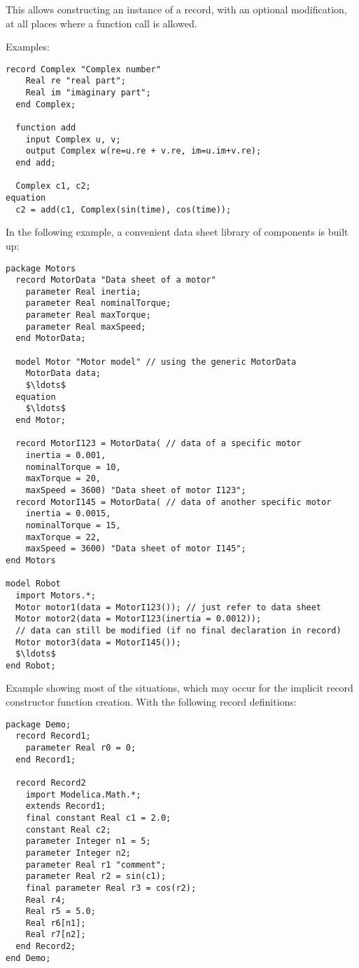 \begin{nonnormative}
This allows constructing an instance of a record, with an
optional modification, at all places where a function call is allowed.

Examples:
\begin{lstlisting}[language=modelica]
  record Complex "Complex number"
    Real re "real part";
    Real im "imaginary part";
  end Complex;

  function add
    input Complex u, v;
    output Complex w(re=u.re + v.re, im=u.im+v.re);
  end add;

  Complex c1, c2;
equation
  c2 = add(c1, Complex(sin(time), cos(time));
\end{lstlisting}

In the following example, a convenient data sheet library of
components is built up:
\begin{lstlisting}[language=modelica]
package Motors
  record MotorData "Data sheet of a motor"
    parameter Real inertia;
    parameter Real nominalTorque;
    parameter Real maxTorque;
    parameter Real maxSpeed;
  end MotorData;

  model Motor "Motor model" // using the generic MotorData
    MotorData data;
    $\ldots$
  equation
    $\ldots$
  end Motor;

  record MotorI123 = MotorData( // data of a specific motor
    inertia = 0.001,
    nominalTorque = 10,
    maxTorque = 20,
    maxSpeed = 3600) "Data sheet of motor I123";
  record MotorI145 = MotorData( // data of another specific motor
    inertia = 0.0015,
    nominalTorque = 15,
    maxTorque = 22,
    maxSpeed = 3600) "Data sheet of motor I145";
end Motors

model Robot
  import Motors.*;
  Motor motor1(data = MotorI123()); // just refer to data sheet
  Motor motor2(data = MotorI123(inertia = 0.0012));
  // data can still be modified (if no final declaration in record)
  Motor motor3(data = MotorI145());
  $\ldots$
end Robot;
\end{lstlisting}

Example showing most of the situations, which may occur for the
implicit record constructor function creation. With the following record
definitions:
\begin{lstlisting}[language=modelica]
package Demo;
  record Record1;
    parameter Real r0 = 0;
  end Record1;

  record Record2
    import Modelica.Math.*;
    extends Record1;
    final constant Real c1 = 2.0;
    constant Real c2;
    parameter Integer n1 = 5;
    parameter Integer n2;
    parameter Real r1 "comment";
    parameter Real r2 = sin(c1);
    final parameter Real r3 = cos(r2);
    Real r4;
    Real r5 = 5.0;
    Real r6[n1];
    Real r7[n2];
  end Record2;
end Demo;
\end{lstlisting}


\end{nonnormative}

